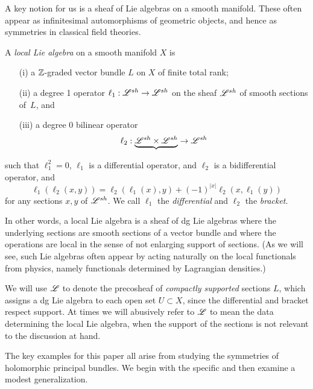 \documentclass[10pt]{amsart}
\begin{document}

A key notion for us is a sheaf of Lie algebras on a smooth manifold.
These often appear as infinitesimal automorphisms of geometric objects,
and hence as symmetries in classical field theories.

\begin{dfn} 
A {\em local Lie algebra} on a smooth manifold $X$ is 
\begin{itemize}
\item[(i)] a $\mathbb Z$-graded vector bundle $L$ on $X$ of finite total rank;
\item[(ii)] a degree 1 operator $\ell_1:\mathscr L^{sh} \to \mathscr L^{sh}$ on the sheaf $\mathscr L^{sh}$ of smooth sections of~$L$, and
\item[(iii)] a degree 0 bilinear operator
\[
\ell_2 : \underbrace{\mathscr L^{sh} \times \mathscr L^{sh}} \to \mathscr L^{sh}
\]
\end{itemize}
such that $\ell_1^2 = 0$, $\ell_1$ is a differential operator, and $\ell_2$ is a bidifferential operator, and
\[
\ell_1(\ell_2(x,y)) = \ell_2(\ell_1(x), y) + (-1)^{|x|} \ell_2(x, \ell_1(y))
\]
for any sections $x,y$ of $\mathscr L^{sh}$.
We call $\ell_1$ the {\em differential} and $\ell_2$ the {\em bracket}.
\end{dfn}

In other words, a local Lie algebra is a sheaf of dg Lie algebras 
where the underlying sections are smooth sections of a vector bundle and 
where the operations are local in the sense of not enlarging support of sections. 
(As we will see, such Lie algebras often appear by acting naturally on the local functionals from physics, namely functionals determined by Lagrangian densities.)

\begin{rmk}
We will use $\mathscr L$ to denote the precosheaf of {\em compactly supported} sections $L$,
which assigns a dg Lie algebra to each open set $U \subset X$, 
since the differential and bracket respect support.
At times we will abusively refer to $\mathscr L$ to mean the data determining the local Lie algebra,
when the support of the sections is not relevant to the discussion at hand.
\end{rmk}

The key examples for this paper all arise from studying the symmetries of holomorphic principal bundles.
We begin with the specific and then examine a modest generalization.
\end{document}
